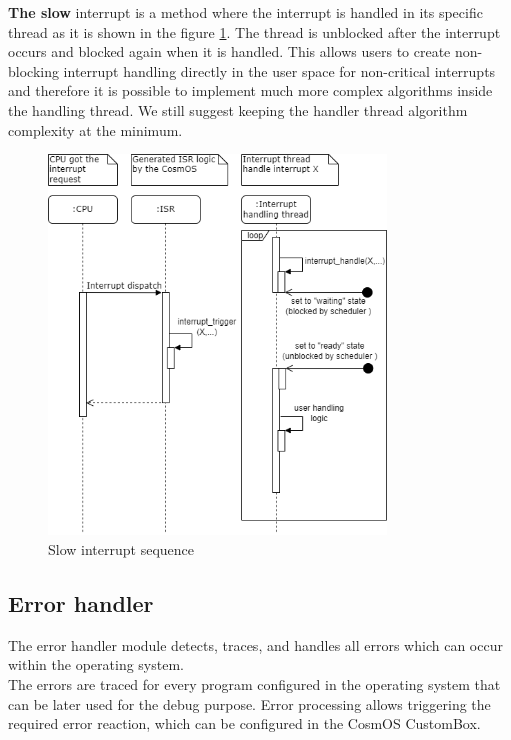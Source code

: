\textbf{The slow} interrupt is a method where the interrupt is handled in its specific thread as it is shown in the figure \ref{fig:slowInterrupts}. The thread is unblocked after the interrupt occurs and blocked again when it is handled. This allows users to create non-blocking interrupt handling directly in the user space for non-critical interrupts and therefore it is possible to implement much more complex algorithms inside the handling thread. We still suggest keeping the handler thread algorithm complexity at the minimum.

\begin{figure}[H]
\begin{center}
\includegraphics[width=0.8\textwidth]{images/slow_interrupt.png}
\caption{Slow interrupt sequence}
\label{fig:slowInterrupts}
\end{center}
\end{figure}

\subsection{Error handler}
The error handler module detects, traces, and handles all errors which can occur within the operating system. \\
\indent The errors are traced for every program configured in the operating system that can be later used for the debug purpose. Error processing allows triggering the required error reaction, which can be configured in the CosmOS CustomBox.

